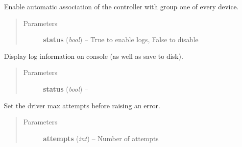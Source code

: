 \documentclass[letterpaper,10pt,english]{sphinxmanual}
\begin{document}
\begin{fulllineitems}
\begin{fulllineitems}
\end{fulllineitems}


\begin{fulllineitems}
\label{option:openzwave.option.ZWaveOption.set_associate}
Enable automatic association of the controller with group one of every device.
\begin{quote}\begin{description}
\item[{Parameters}] \leavevmode
\textbf{status} (\emph{bool}) -- True to enable logs, False to disable

\end{description}\end{quote}

\end{fulllineitems}


\begin{fulllineitems}
\label{option:openzwave.option.ZWaveOption.set_console_output}
Display log information on console (as well as save to disk).
\begin{quote}\begin{description}
\item[{Parameters}] \leavevmode
\textbf{status} (\emph{bool}) -- 

\end{description}\end{quote}

\end{fulllineitems}


\begin{fulllineitems}
\label{option:openzwave.option.ZWaveOption.set_driver_max_attempts}
Set the driver max attempts before raising an error.
\begin{quote}\begin{description}
\item[{Parameters}] \leavevmode
\textbf{attempts} (\emph{int}) -- Number of attempts

\end{description}\end{quote}


\end{fulllineitems}
\end{fulllineitems}
\end{document}
